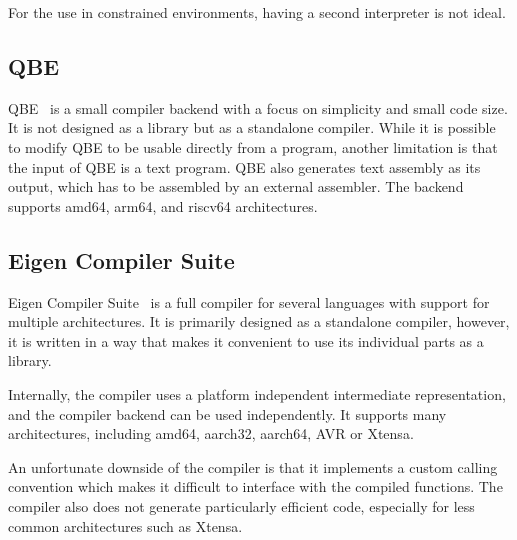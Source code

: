 For the use in constrained environments, having a second interpreter is not ideal.


\subsection{QBE}

QBE~\cite{qbe} is a small compiler backend with a focus on simplicity and small code size. It is not designed as a library but as a standalone compiler. While it is possible to modify QBE to be usable directly from a program, another limitation is that the input of QBE is a text program. QBE also generates text assembly as its output, which has to be assembled by an external assembler. The backend supports amd64, arm64, and riscv64 architectures.


\subsection{Eigen Compiler Suite}

Eigen Compiler Suite~\cite{ecs} is a full compiler for several languages with support for multiple architectures. It is primarily designed as a standalone compiler, however, it is written in a way that makes it convenient to use its individual parts as a library.

Internally, the compiler uses a platform independent intermediate representation, and the compiler backend can be used independently. It supports many architectures, including amd64, aarch32, aarch64, AVR or Xtensa.

An unfortunate downside of the compiler is that it implements a custom calling convention which makes it difficult to interface with the compiled functions. The compiler also does not generate particularly efficient code, especially for less common architectures such as Xtensa.
